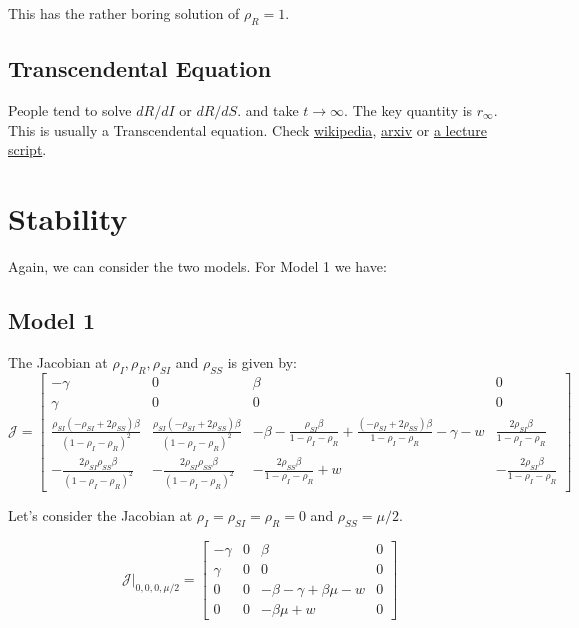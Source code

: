 \documentclass[a4paper,10pt]{article}
\begin{document}
This has the rather boring solution of $\rho_R=1$.

\subsection{Transcendental Equation}
People tend to solve $dR/dI$ or $dR/dS$. and take $t\to\infty$. The key quantity is $r_\infty$.
This is usually a Transcendental equation. 
Check 
\href{https://en.wikipedia.org/wiki/Compartmental_models_in_epidemiology}{wikipedia},
\href{https://arxiv.org/pdf/1403.2160.pdf}{arxiv} or
\href{https://math.unm.edu/~sulsky/mathcamp/SIR.pdf}{a lecture script}.

\section{Stability}

Again, we can consider the two models. For Model 1 we have:

\subsection{Model 1}

The Jacobian at $\rho_I,\rho_R,\rho_{SI}$ and $\rho_{SS}$ is given by:
\begin{equation}
\mathcal J=
\left[
\begin{array}{cccc}
 -\gamma & 0 & \beta & 0 \\
 \gamma & 0 & 0 & 0 \\
 
\frac{\rho_{SI} (-\rho_{SI} + 2 \rho_{SS}) \beta}{(1 - \rho_I - 
  \rho_R)^2} &
  \frac{\rho_{SI} (-\rho_{SI} + 2 \rho_{SS}) \beta}{(1 - \rho_I - \rho_R)^2} & 
  -\beta - \frac{ \rho_{SI} \beta}{1 - \rho_I - \rho_R} + \frac{(-\rho_{SI} + 2 \rho_{SS}) \beta}{
 1 - \rho_I - \rho_R} - \gamma - w &
 \frac{2 \rho_{SI} \beta}{1 - \rho_I - \rho_R}
\\
-\frac{2 \rho_{SI} \rho_{SS} \beta}{(1 - \rho_I - \rho_R)^2} &
-\frac{ 2 \rho_{SI} \rho_{SS} \beta}{(1 - \rho_I - \rho_R)^2} &
-\frac{2 \rho_{SS} \beta}{ 1 - \rho_I - \rho_R} + w &
-\frac{2 \rho_{SI} \beta}{1 - \rho_I - \rho_R}
\end{array}\right]\nonumber
\end{equation}

Let's consider the Jacobian at $\rho_I=\rho_{SI}=\rho_R=0$ and $\rho_{SS}=\mu/2$.

\begin{equation}
\mathcal J\big|_{0,0,0,\mu/2}=
\left[
\begin{array}{cccc}
 -\gamma & 0 & \beta & 0 \\
 \gamma & 0 & 0 & 0 \\
 0 & 0 & -\beta-\gamma+\beta\mu -w &0 \\
 0 & 0 & -\beta\mu+w & 0
\end{array}\right]
\end{equation}
\end{document}
